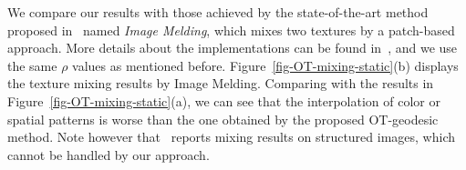 We compare our results with those achieved by the state-of-the-art method proposed in~\cite{ImageMelding12} named \emph{Image Melding}, which mixes two textures by a patch-based approach. More details about the implementations can be found in~\cite{ImageMelding12}, and we use the same $\rho$ values as mentioned before.
Figure~\ref{fig-OT-mixing-static}(b) displays the texture mixing results by Image Melding.
Comparing with the results in Figure~\ref{fig-OT-mixing-static}(a), we can see that the interpolation of color or spatial patterns is worse than the one obtained by the proposed OT-geodesic method. Note however that~\cite{ImageMelding12} reports mixing results on structured images, which cannot be handled by our approach.

\newcommand{\DispTexture}[2]{ %
\texttt{[image: \#1-0-\#2]}&%
\texttt{[image: \#1-1-\#2]}&%
\texttt{[image: \#1-2-\#2]}&%
\texttt{[image: \#1-3-\#2]}&%
\texttt{[image: \#1-4-\#2]}&%
\texttt{[image: \#1-5-\#2]}&%
\texttt{[image: \#1-6-\#2]}&%
\texttt{[image: \#1-7-\#2]}%
}
\newcommand{\DispTextureR}[2]{ %
\texttt{[image: \#1-7-\#2]}&%
\texttt{[image: \#1-6-\#2]}&%
\texttt{[image: \#1-5-\#2]}&%
\texttt{[image: \#1-4-\#2]}&%
\texttt{[image: \#1-3-\#2]}&%
\texttt{[image: \#1-2-\#2]}&%
\texttt{[image: \#1-1-\#2]}&%
\texttt{[image: \#1-0-\#2]} %
}
\newcommand{\TabHeight}[1]{
	 \begin{tabular}{@{}c@{\hspace{1mm}}c@{\hspace{1mm}}c@{\hspace{1mm}}c@{\hspace{1mm}}c@{\hspace{1mm}}c@{\hspace{1mm}}c@{\hspace{1mm}}c@{\hspace{1mm}}@{}}
		#1
    \end{tabular}
}

